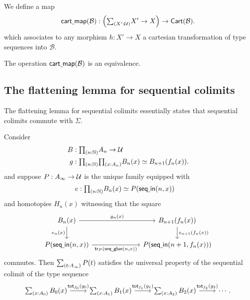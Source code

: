 \begin{defn}
We define a map
\begin{equation*}
\mathsf{cart\usc{}map}(\mathcal{B}) : \Big(\sm{X':\UU}X'\to X\Big)\to\mathsf{Cart}(\mathcal{B}).
\end{equation*}
which associates to any morphism $h:X'\to X$ a cartesian transformation of type sequences into $\mathcal{B}$.
\end{defn}

\begin{thm}
The operation $\mathsf{cart\underline{\ }{}map}(\mathcal{B})$ is an equivalence.
\end{thm}

\subsection{The flattening lemma for sequential colimits}

The flattening lemma for sequential colimits essentially states that sequential colimits commute with $\Sigma$. 

\begin{lem}
Consider
\begin{align*}
B & : \prd{n:\N}A_n\to\UU \\
g & : \prd{n:\N}{x:A_n}\eqv{B_n(x)}{B_{n+1}(f_n(x))}.
\end{align*}
and suppose $P:A_\infty\to\mathcal{U}$ is the unique family equipped with
\begin{align*}
e & : \prd{n:\N}\eqv{B_n(x)}{P(\mathsf{seq\usc{}in}(n,x))}
\end{align*}
and homotopies $H_n(x)$ witnessing that the square
\begin{equation*}
\begin{tikzcd}[column sep=7em]
B_n(x) \arrow[r,"g_n(x)"] \arrow[d,swap,"e_n(x)"] & B_{n+1}(f_n(x)) \arrow[d,"e_{n+1}(f_n(x))"] \\
P(\mathsf{seq\usc{}in}(n,x)) \arrow[r,swap,"{\mathsf{tr}_P(\mathsf{seq\usc{}glue}(n,x))}"] & P(\mathsf{seq\usc{}in}(n+1,f_n(x)))
\end{tikzcd}
\end{equation*}
commutes. Then $\sm{t:A_\infty}P(t)$ satisfies the universal property of the sequential colimit of the type sequence
\begin{equation*}
\begin{tikzcd}
\sm{x:A_0}B_0(x) \arrow[r,"{\total[f_0]{g_0}}"] & \sm{x:A_1}B_1(x) \arrow[r,"{\total[f_1]{g_1}}"] & \sm{x:A_2}B_2(x) \arrow[r,"{\total[f_2]{g_2}}"] & \cdots.
\end{tikzcd}
\end{equation*}
\end{lem}

